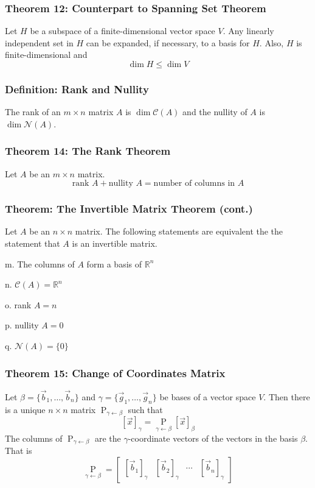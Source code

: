 \documentclass{article}
\begin{document}
\subsubsection*{Theorem 12: Counterpart to Spanning Set Theorem}
Let $H$ be a subspace of a finite-dimensional vector space $V$. Any linearly independent set in $H$ can be expanded, if necessary, to a basis for $H$. Also, $H$ is finite-dimensional and 
$$\dim H \leq \dim V$$

\subsubsection*{Definition: Rank and Nullity}
The rank of an $m \times n$ matrix $A$ is $\dim \mathcal{C}(A)$ and the nullity of $A$ is $\dim \mathcal{N}(A)$.

\subsubsection*{Theorem 14: The Rank Theorem}
Let $A$ be an $m \times n$ matrix.
$$\text{rank }A + \text{nullity }A = \text{number of columns in }A$$

\subsubsection*{Theorem: The Invertible Matrix Theorem (cont.)}
Let $A$ be an $n \times n$ matrix. The following statements are equivalent the the statement that $A$ is an invertible matrix. 

m. The columns of $A$ form a basis of $\mathbb{R}^n$

n. $\mathcal{C}(A) = \mathbb{R}^n$

o. rank $A=n$

p. nullity $A = 0$

q. $\mathcal{N}(A) = \{ 0 \}$

\subsubsection*{Theorem 15: Change of Coordinates Matrix}
Let $\beta = \{ \vec b_1 , \dots , \vec b_n \}$ and $\gamma = \{ \vec g_1 , \dots , \vec g_n \}$ be bases of a vector space $V$. Then there is a unique $n \times n$ matrix $\mathop{P}_{\gamma \leftarrow \beta}$ such that
$$\left[ \vec x \right]_\gamma = \mathop{P}\limits_{\gamma \leftarrow \beta} \left[ \vec x \right]_\beta$$
The columns of $\mathop{P}_{\gamma \leftarrow \beta}$ are the $\gamma$-coordinate vectors of the vectors in the basis $\beta$. That is
$$\mathop{P}\limits_{\gamma \leftarrow \beta} = \begin{bmatrix}
    [\vec b_1]_\gamma & [\vec b_2]_\gamma & \cdots & [\vec b_n]_\gamma
\end{bmatrix}$$
\end{document}
